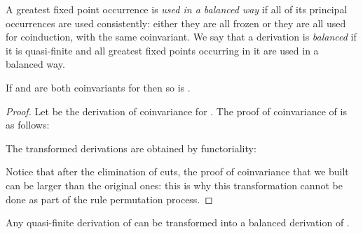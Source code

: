 \begin{definition}
A greatest fixed point occurrence is \emph{used in a balanced way}
if all of its principal occurrences are used consistently:
either they are all frozen or they are all used for coinduction, 
with the same coinvariant.
We say that a derivation is \emph{balanced} if it is quasi-finite
and all greatest fixed points occurring in it are used in a balanced way.
\end{definition}

\begin{lemma}\label{lem:invwith}
If  and  are both coinvariants for 
then so is .
\end{lemma}

\begin{proof}
Let  be the derivation of coinvariance for .
The proof of coinvariance of  is as follows:

The transformed derivations  are obtained by functoriality:

Notice that after the elimination of cuts, the proof of coinvariance
that we built can be larger than the original ones:
this is why this transformation cannot be done as part of
the rule permutation process.
\end{proof}

\begin{lemma} \label{lem:balance}
Any quasi-finite derivation of 
can be transformed into a balanced
derivation of .
\end{lemma}

